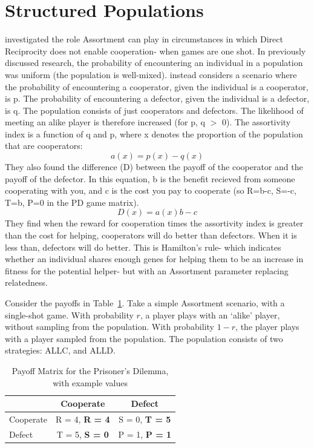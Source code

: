 \documentclass[a4paper,11pt]{article}
\begin{document}
\section{Structured Populations}
\label{sec:ass}
\citet{bergstrom2003algebra} investigated the role Assortment can play in circumstances in which Direct Reciprocity does not enable cooperation- when games are one shot. 
In previously discussed research, the probability of encountering an individual in a population was uniform (the population is well-mixed). 
\citet{bergstrom2003algebra} instead considers a scenario where the probability of encountering a cooperator, given the individual is a cooperator, is p. The probability of encountering a defector, given the individual is a defector, is q. 
The population consists of just cooperators and defectors. The likelihood of meeting an alike player is therefore increased (for p, q $>$ 0). The assortivity index is a function of q and p, where x denotes the proportion of the population that are cooperators:
\begin{equation*}
a(x)=p(x)-q(x)
\end{equation*}
They also found the difference (D) between the payoff of the cooperator and the payoff of the defector. 
In this equation, b is the benefit recieved from someone cooperating with you, and c is the cost you pay to cooperate (so R=b-c, S=-c, T=b, P=0 in the PD game matrix).
\begin{equation}
D(x)=a(x)b-c
\end{equation}
They find when the reward for cooperation times the assortivity index is greater than the cost for helping, cooperators will do better than defectors. When it is less than, defectors will do better. 
This is Hamilton's rule- which indicates whether an individual shares enough genes for helping them to be an increase in fitness for the potential helper- but with an Assortment parameter replacing relatedness. 

Consider the payoffs in Table~\ref{table:payoffs2}. 
Take a simple Assortment scenario, with a single-shot game. 
With probability $r$, a player plays with an `alike' player, without sampling from the population. 
With probability $1-r$, the player plays with a player sampled from the population. 
The population consists of two strategies: ALLC, and ALLD.

\begin{table}[h]\centering
\captionsetup{justification=centering}
\begin{tabular}{|l|c|c|}
\hline
 & \bf{Cooperate} & \bf{Defect}\\
\hline
Cooperate & R = 4, \bf{R = 4} & S = 0, \bf{T = 5}\\
\hline
Defect & T = 5, \bf{S = 0}  & P = 1, \bf{P = 1} \\
\hline
\end{tabular}
\caption{Payoff Matrix for the Prisoner's Dilemma, with example values}
\label{table:payoffs2}
\end{table}
\end{document}
